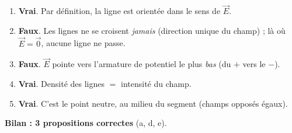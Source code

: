 \documentclass[11pt,a4paper]{article}
\newcommand{\vv}[1]{\vec{#1}}\newcommand{\ds}{\displaystyle}
\begin{document}
\begin{corrige}
\begin{enumerate}[label=\alph*)]
  \item \textbf{Vrai}. Par définition, la ligne est orientée dans le sens de $\vv{E}$.
  \item \textbf{Faux}. Les lignes ne se croisent \emph{jamais} (direction unique du champ) ; là où
        $\vv{E}=\vv{0}$, aucune ligne ne passe.
  \item \textbf{Faux}. $\vv{E}$ pointe vers l'armature de potentiel le plus \emph{bas} (du $+$ vers
        le $-$).
  \item \textbf{Vrai}. Densité des lignes $=$ intensité du champ.
  \item \textbf{Vrai}. C'est le point neutre, au milieu du segment (champs opposés égaux).
\end{enumerate}
\textbf{Bilan : 3 propositions correctes} (a, d, e).
\end{corrige}
\end{document}
